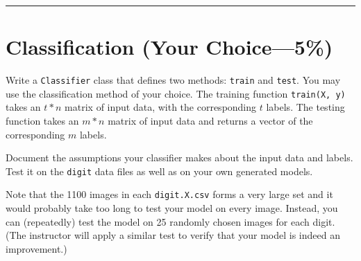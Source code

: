 \documentclass[12pt]{article}
\begin{document}
\vspace*{1\baselineskip}


\bigskip
\hrule

\section{Classification \rm(Your Choice---5\%)}
Write a {\tt Classifier} class that defines two methods: {\tt train} and {\tt test}. You may use the classification method of your choice. The training function {\tt train(X, y)} takes an $t*n$ matrix of input data, with the corresponding $t$ labels. The testing function takes an $m*n$ matrix of input data and returns a vector of the corresponding $m$ labels.

Document the assumptions your classifier makes about the input data and labels. Test it on the {\tt digit} data files as well as on your own generated models. 

Note that the 1100 images in each {\tt digit.X.csv} forms a very large set
and it would probably take too long to test your model on every image.
Instead, you can (repeatedly) test the model on 25 randomly chosen
images for each digit.
(The instructor will apply a similar test to verify that your model is indeed
an improvement.)
\end{document}
